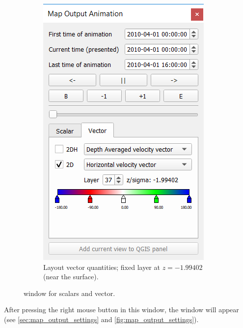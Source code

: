 \documentclass{deltares_memo}
\begin{document}
\begin{figure}[H]
\begin{subfigure}[b]{0.48\textwidth}
\end{subfigure}
\hfill
\begin{subfigure}[b]{0.48\textwidth}
	\centering    
	\includegraphics[width=\textwidth]{pictures/map_output_animation_window_vector.png}
	\caption{Layout vector quantities; fixed layer at $z = -1.99402$ (near the surface).}
\end{subfigure}    
    \caption{ window for scalars and vector.}
\end{figure}

After pressing the right mouse button in this window, the window  will appear (see  \autoref{sec:map_output_settings} and \autoref{fig:map_output_settings}).
\end{document}
